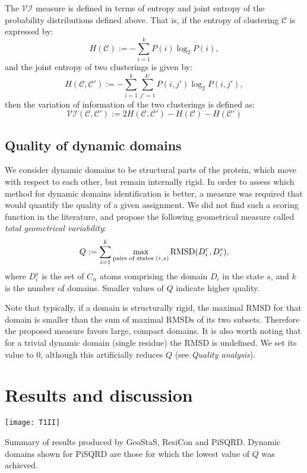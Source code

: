 \documentclass[a4paper,11pt,twoside]{book}%
\begin{document}
The $\mathcal{VI}$ measure is defined in terms of entropy and joint entropy of the probability distributions defined above.
That is, if the entropy of clustering $\mathcal{C}$ is expressed by: $$H(\mathcal{C}) := -\sum_{i=1}^k P(i) \log_2 P(i),$$
and the joint entropy of two clusterings is given by: $$ H(\mathcal{C},\mathcal{C'}) := - \sum_{i=1}^k \sum_{j'=1}^{k'} P(i,j') \log_2 P(i,j'), $$
then the variation of information of the two clusterings is defined as: $$ \mathcal{VI}(\mathcal{C},\mathcal{C'}) := 2 H(\mathcal{C},\mathcal{C'}) - H(\mathcal{C}) - H(\mathcal{C'}) $$

\subsection*{Quality of dynamic domains}
We consider dynamic domains to be structural parts of the protein, which move with respect to each other, but remain internally rigid.
In order to assess which method for dynamic domains identification is better, a measure was required that would quantify the quality of a given assignment.
We did not find such a scoring function in the literature, and propose the following geometrical measure called \emph{total geometrical variability}:
$$
Q := \sum_{i=1}^k \max_{\text{pairs of states }\\(r,s)} \text{RMSD}(D^r_i,D^s_i),
$$
where $D^s_i$ is the set of $C_\alpha$ atoms comprising the domain $D_i$ in the state $s$, and $k$ is the number of domains.
Smaller values of $Q$ indicate higher quality.


Note that typically, if a domain is structurally rigid, the maximal RMSD for that domain is smaller than the sum of maximal $\text{RMSDs}$ of its two subsets.
Therefore the proposed measure favors large, compact domains.
It is also worth noting that for a trivial dynamic domain (single residue) the RMSD is undefined.
We set its value to 0, although this artificially reduces $Q$ (see \emph{Quality analysis}).


\section{Results and discussion}
\begin{table*}[b]
\hspace{-0.7cm}
\texttt{[image: T1II]}
\caption{Summary of results produced by GeoStaS, ResiCon and PiSQRD.
Dynamic domains shown for PiSQRD are those for which the lowest value of $Q$ was achieved.}
\label{wholeTable}
\end{table*}
\end{document}
